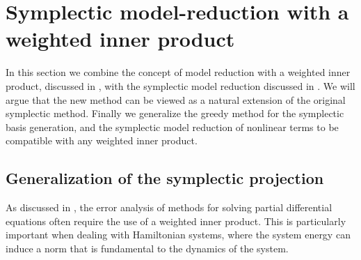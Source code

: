 \section{Symplectic model-reduction with a weighted inner product} \label{sec:normmor}

In this section we combine the concept of model reduction with a weighted inner product, discussed in , with the symplectic model reduction discussed in . We will argue that the new method can be viewed as a natural extension of the original symplectic method. Finally we generalize the greedy method for the symplectic basis generation, and the symplectic model reduction of nonlinear terms to be compatible with any weighted inner product.

\subsection{Generalization of the symplectic projection} \label{sec:normmor.1}
As discussed in , the error analysis of methods for solving partial differential equations often require the use of a weighted inner product. This is particularly important when dealing with Hamiltonian systems, where the system energy can induce a norm that is fundamental to the dynamics of the system.

